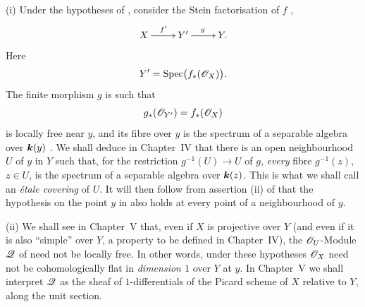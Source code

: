 \begin{remarks}[7.8.10]
\label{III.7.8.10}
\textnormal{(i)}
Under the hypotheses of , consider the
Stein factorisation of $f$ ,
\[
  \xymatrix{
    X \ar[r]^{f'} & Y' \ar[r]^{g} & Y .
  }
\]
Here
\[
  Y'=\operatorname{Spec}\bigl(f_*(\mathscr{O}_X)\bigr).
\]
The finite morphism $g$ is such that
\[
  g_*(\mathscr{O}_{Y'})=f_*(\mathscr{O}_X)
\]
is locally free near $y$, and its fibre over $y$ is the
spectrum of a separable algebra over $\boldsymbol{k}(y)$
.  We shall deduce in Chapter~IV that
there is an open neighbourhood $U$ of $y$ in $Y$ such that,
for the restriction $g^{-1}(U)\to U$ of $g$, \emph{every}
fibre $g^{-1}(z)$, $z\in U$, is the spectrum of a separable
algebra over $\boldsymbol{k}(z)$.  This is what we shall call an
\emph{\'etale covering} of $U$.  It will then follow from
assertion (ii) of  that the hypothesis on
the point $y$ in  also holds at every point
of a neighbourhood of $y$.

\medskip
\textnormal{(ii)}
We shall see in Chapter~V that, even if $X$ is projective
over $Y$ (and even if it is also ``simple'' over $Y$, a
property to be defined in Chapter~IV), the
$\mathscr{O}_U$-Module $\mathscr{Q}$ of  need not be
locally free.  In other words, under these hypotheses
$\mathscr{O}_X$ need not be cohomologically flat in
\emph{dimension $1$} over $Y$ at $y$.  In Chapter~V we
shall interpret $\mathscr{Q}$ as the sheaf of
$1$-differentials of the Picard scheme of $X$ relative to
$Y$, along the unit section.
\end{remarks}
